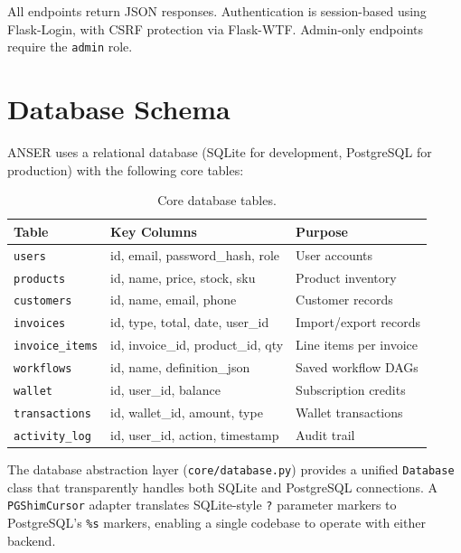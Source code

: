 \documentclass[11pt,a4paper]{report}
\begin{document}
All endpoints return JSON responses. Authentication is session-based using Flask-Login, with CSRF protection via Flask-WTF. Admin-only endpoints require the \texttt{admin} role.

\section{Database Schema}

ANSER uses a relational database (SQLite for development, PostgreSQL for production) with the following core tables:

\begin{table}[H]
\centering
\caption{Core database tables.}
\label{tab:db-schema}
\small
\begin{tabular}{lll}
\toprule
\textbf{Table} & \textbf{Key Columns} & \textbf{Purpose} \\
\midrule
\texttt{users}            & id, email, password\_hash, role   & User accounts \\
\texttt{products}         & id, name, price, stock, sku       & Product inventory \\
\texttt{customers}        & id, name, email, phone            & Customer records \\
\texttt{invoices}         & id, type, total, date, user\_id   & Import/export records \\
\texttt{invoice\_items}   & id, invoice\_id, product\_id, qty & Line items per invoice \\
\texttt{workflows}        & id, name, definition\_json        & Saved workflow DAGs \\
\texttt{wallet}           & id, user\_id, balance             & Subscription credits \\
\texttt{transactions}     & id, wallet\_id, amount, type      & Wallet transactions \\
\texttt{activity\_log}    & id, user\_id, action, timestamp   & Audit trail \\
\bottomrule
\end{tabular}
\end{table}

The database abstraction layer (\texttt{core/database.py}) provides a unified \texttt{Database} class that transparently handles both SQLite and PostgreSQL connections. A \texttt{PGShimCursor} adapter translates SQLite-style \texttt{?} parameter markers to PostgreSQL's \texttt{\%s} markers, enabling a single codebase to operate with either backend.

\end{document}
